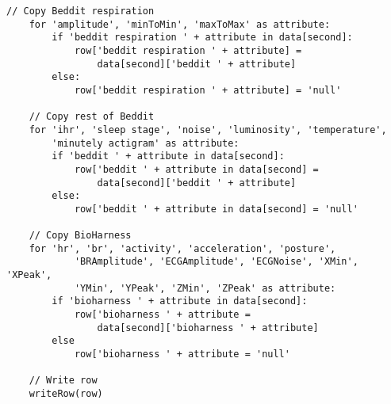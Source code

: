 \begin{lstlisting}[caption=Pseudocode]
	// Copy Beddit respiration
	for 'amplitude', 'minToMin', 'maxToMax' as attribute:
		if 'beddit respiration ' + attribute in data[second]:
			row['beddit respiration ' + attribute] = 
				data[second]['beddit ' + attribute]
		else:
			row['beddit respiration ' + attribute] = 'null'

	// Copy rest of Beddit
	for 'ihr', 'sleep stage', 'noise', 'luminosity', 'temperature',
		'minutely actigram' as attribute:
		if 'beddit ' + attribute in data[second]:
			row['beddit ' + attribute in data[second] =
				data[second]['beddit ' + attribute]
		else:
			row['beddit ' + attribute in data[second] = 'null'

	// Copy BioHarness
	for 'hr', 'br', 'activity', 'acceleration', 'posture',
			'BRAmplitude', 'ECGAmplitude', 'ECGNoise', 'XMin', 'XPeak',
			'YMin', 'YPeak', 'ZMin', 'ZPeak' as attribute:
		if 'bioharness ' + attribute in data[second]:
			row['bioharness ' + attribute =
				data[second]['bioharness ' + attribute]
		else
			row['bioharness ' + attribute = 'null'

	// Write row
	writeRow(row)

	

\end{lstlisting}
